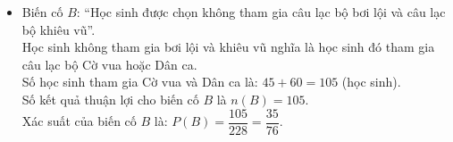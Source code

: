 \begin{bt}
{\begin{enumerate}[a)]
\begin{itemize}
        Tổng số học sinh nữ là: $17 + 45 + 40 + 24 = 126$ (học sinh).\\
        Số kết quả thuận lợi cho $A$ là $n(A) = 126$.\\
        Xác suất của biến cố $A$ là:
        $P(A) = \dfrac{126}{228} = \dfrac{21}{38}$.
        \item Biến cố $B$: “Học sinh được chọn không tham gia câu lạc bộ bơi lội và câu lạc bộ khiêu vũ”.\\
        Học sinh không tham gia bơi lội và khiêu vũ nghĩa là học sinh đó tham gia câu lạc bộ Cờ vua hoặc Dân ca.\\
        Số học sinh tham gia Cờ vua và Dân ca là:
        $45 + 60 = 105$ (học sinh).\\
        Số kết quả thuận lợi cho biến cố $B$ là $n(B) = 105$.\\
        Xác suất của biến cố $B$ là:
        $P(B) = \dfrac{105}{228} = \dfrac{35}{76}$.
    \end{itemize}
\end{enumerate}
}
\end{bt}

